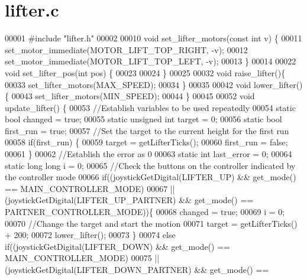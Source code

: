 \section{lifter.\+c}
\label{lifter_8c_source}

\begin{DoxyCode}
00001 \textcolor{preprocessor}{#include "lifter.h"}
00002 
00010 \textcolor{keywordtype}{void} set_lifter_motors(\textcolor{keyword}{const} \textcolor{keywordtype}{int} v) \{
00011   set_motor_immediate(MOTOR_LIFT_TOP_RIGHT, -v);
00012   set_motor_immediate(MOTOR_LIFT_TOP_LEFT, -v);
00013 \}
00014 
00022 \textcolor{keywordtype}{void} set_lifter_pos(\textcolor{keywordtype}{int} pos) \{
00023 
00024 \}
00025 
00032 \textcolor{keywordtype}{void} raise_lifter()\{
00033   set_lifter_motors(MAX_SPEED);
00034 \}
00035 
00042 \textcolor{keywordtype}{void} lower_lifter()\{
00043   set_lifter_motors(MIN_SPEED);
00044 \}
00045 
00052 \textcolor{keywordtype}{void} update_lifter() \{
00053   \textcolor{comment}{//Establish variables to be used repeatedly}
00054   \textcolor{keyword}{static} \textcolor{keywordtype}{bool} changed = \textcolor{keyword}{true};
00055   \textcolor{keyword}{static} \textcolor{keywordtype}{unsigned} \textcolor{keywordtype}{int} target = 0;
00056   \textcolor{keyword}{static} \textcolor{keywordtype}{bool} first\_run = \textcolor{keyword}{true};
00057   \textcolor{comment}{//Set the target to the current height for the first run}
00058   \textcolor{keywordflow}{if}(first\_run) \{
00059     target = getLifterTicks();
00060     first\_run = \textcolor{keyword}{false};
00061   \}
00062   \textcolor{comment}{//Establish the error as 0}
00063   \textcolor{keyword}{static} \textcolor{keywordtype}{int} last\_error = 0;
00064   \textcolor{keyword}{static} \textcolor{keywordtype}{long} \textcolor{keywordtype}{long} i = 0;
00065   \textcolor{comment}{//Check the buttons on the controller indicated by the controller mode}
00066   \textcolor{keywordflow}{if}((joystickGetDigital(LIFTER_UP) && get_mode() == MAIN_CONTROLLER_MODE)
00067    || (joystickGetDigital(LIFTER_UP_PARTNER) && get_mode() == 
      PARTNER_CONTROLLER_MODE))\{
00068     changed = \textcolor{keyword}{true};
00069     i = 0;
00070     \textcolor{comment}{//Change the target and start the motion}
00071     target = getLifterTicks() + 200;
00072     lower_lifter();
00073   \}
00074   \textcolor{keywordflow}{else} \textcolor{keywordflow}{if}((joystickGetDigital(LIFTER_DOWN) && get_mode() == MAIN_CONTROLLER_MODE)
00075    || (joystickGetDigital(LIFTER_DOWN_PARTNER) && get_mode() == 

\end{DoxyCode}
